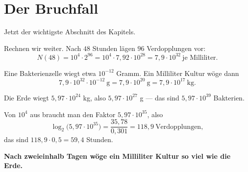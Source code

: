 \section{Der Bruchfall}

Jetzt der wichtigste Abschnitt des Kapitels.

\begin{warnung}
Rechnen wir weiter. Nach $48$ Stunden lägen $96$ Verdopplungen vor:
\[ N(48) = 10^4 \cdot 2^{96} = 10^4 \cdot 7{,}92\cdot10^{28} = 7{,}9\cdot10^{32} \ \text{je Milliliter} . \]

Eine Bakterienzelle wiegt etwa $10^{-12}$ Gramm. Ein Milliliter Kultur wöge dann
\[ 7{,}9\cdot10^{32} \cdot 10^{-12}\ \text{g} = 7{,}9\cdot10^{20}\ \text{g} = 7{,}9\cdot10^{17}\ \text{kg} . \]

Die Erde wiegt $5{,}97\cdot10^{24}$ kg, also $5{,}97\cdot10^{27}$ g --- das sind $5{,}97\cdot10^{39}$ Bakterien.

Von $10^4$ aus braucht man den Faktor $5{,}97\cdot10^{35}$, also
\[ \log_2\bigl(5{,}97\cdot10^{35}\bigr) = \frac{35{,}78}{0{,}301} = 118{,}9 \ \text{Verdopplungen} , \]
das sind $118{,}9 \cdot 0{,}5 = 59{,}4$ Stunden.

\begin{center}
\begin{minipage}{0.9\textwidth}
\textbf{Nach zweieinhalb Tagen wöge ein Milliliter Kultur so viel wie die Erde.}
\end{minipage}
\end{center}

\begin{center}
\begin{minipage}{0.88\textwidth}
\end{minipage}
\end{center}
\end{warnung}

